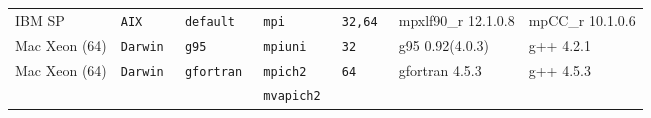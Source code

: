 \begin{tabular}{lllllll}
IBM SP                &\tt AIX    &\tt default      &\tt mpi        &\tt 32,64           & mpxlf90\_r \footnotesize 12.1.0.8  & mpCC\_r \footnotesize 10.1.0.6  \\ %
Mac Xeon (64)         &\tt Darwin &\tt g95          &\tt mpiuni     &\tt 32              & g95 \footnotesize 0.92(4.0.3)       & g++ \footnotesize 4.2.1         \\ %
Mac Xeon (64)         &\tt Darwin &\tt gfortran     &\tt mpich2     &\tt 64              & gfortran \footnotesize 4.5.3       & g++ \footnotesize 4.5.3         \\ %
                      &           &                 &\tt mvapich2   &                    &                                    &                                 \\

\end{tabular}
